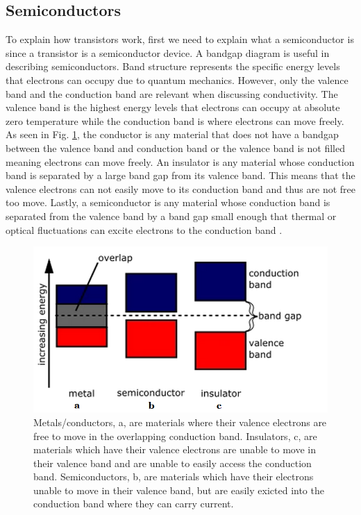 \documentclass[ notitlepage, numerical, 11pt]{revtex4-1} %
\begin{document}
\subsection{Semiconductors}
To explain how transistors work, first we need to explain what a semiconductor is since a transistor is a semiconductor device. A bandgap diagram is useful in describing semiconductors. Band structure represents the specific energy levels that electrons can occupy due to quantum mechanics. However, only the valence band and the conduction band are relevant when discussing conductivity. The valence band is the highest energy levels that electrons can occupy at absolute zero temperature while the conduction band is where electrons can move freely. As seen in Fig. \ref{bandGap}, the conductor is any material that does not have a bandgap between the valence band and conduction band or the valence band is not filled meaning electrons can move freely. An insulator is any material whose conduction band is separated by a large band gap from its valence band. This means that the valence electrons can not easily move to its conduction band and thus are not free too move. Lastly, a semiconductor is any material whose conduction band is separated from the valence band by a band gap small enough that thermal or optical fluctuations can excite electrons to the conduction band \cite{purcell}.


\begin{figure}[H]
\centerline{\includegraphics[scale=.6]{bandGap.png}}
\caption{Metals/conductors, a, are materials where their valence electrons are free to move in the overlapping conduction band. Insulators, c, are materials which have their valence electrons are unable to move in their valence band and are unable to easily access the conduction band. Semiconductors, b, are materials which have their electrons unable to move in their valence band, but are easily exicted into the conduction band where they can carry current.}
\label{bandGap}
\end{figure}
\end{document}

